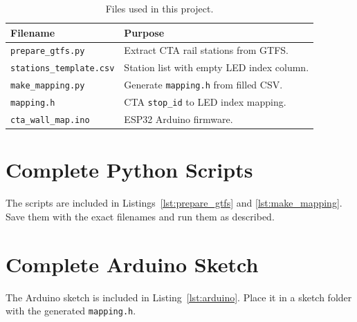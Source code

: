 \documentclass[11pt]{article}
\begin{document}
\begin{table}[H]
\centering
\begin{tabular}{ll}
\toprule
\textbf{Filename} & \textbf{Purpose} \\
\midrule
\texttt{prepare\_gtfs.py} & Extract CTA rail stations from GTFS. \\
\texttt{stations\_template.csv} & Station list with empty LED index column. \\
\texttt{make\_mapping.py} & Generate \texttt{mapping.h} from filled CSV. \\
\texttt{mapping.h} & CTA \texttt{stop\_id} to LED index mapping. \\
\texttt{cta\_wall\_map.ino} & ESP32 Arduino firmware. \\
\bottomrule
\end{tabular}
\caption{Files used in this project.}
\label{tab:files}
\end{table}

\section{Complete Python Scripts}

The scripts are included in Listings~\ref{lst:prepare_gtfs} and \ref{lst:make_mapping}. Save them with the exact filenames and run them as described.

\section{Complete Arduino Sketch}

The Arduino sketch is included in Listing~\ref{lst:arduino}. Place it in a sketch folder with the generated \texttt{mapping.h}.
\end{document}
